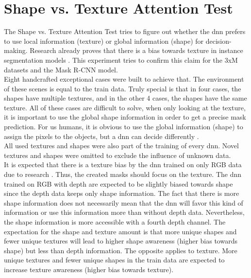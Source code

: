	\section{Shape vs. Texture Attention Test}
	\label{sec:shape-texutre-attention-test}
		The Shape vs. Texture Attention Test tries to figure out whether the \ac{dnn} prefers to use local information (texture) or global information (shape) for decision-making. Research already proves that there is a bias towards texture in instance segmentation models \cite{Theodoridis2022}. This experiment tries to confirm this claim for the 3xM datasets and the Mask R-CNN model.\\
		Eight handcrafted exceptional cases were built to achieve that. The environment of these scenes is equal to the train data. Truly special is that in four cases, the shapes have multiple textures, and in the other 4 cases, the shapes have the same texture. All of these cases are difficult to solve, when only looking at the texture, it is important to use the global shape information in order to get a precise mask prediction. For us humans, it is obvious to use the global information (shape) to assign the pixels to the objects, but a \ac{dnn} can decide differently \cite{Geirhos2020}\cite{Mohla2022}\cite{Baker2020}.\\
		All used textures and shapes were also part of the training of every \ac{dnn}. Novel textures and shapes were omitted to exclude the influence of unknown data.\\
		It is expected that there is a texture bias by the \ac{dnn} trained on only RGB data due to research \cite{Theodoridis2022}. Thus, the created masks should focus on the texture.
		The \ac{dnn} trained on RGB with depth are expected to be slightly biased towards shape since the depth data keeps only shape information. The fact that there is more shape information does not necessarily mean that the \ac{dnn} will favor this kind of information or use this information more than without depth data. Nevertheless, the shape information is more accessible with a fourth depth channel.%
		The expectation for the shape and texture amount is that more unique shapes and fewer unique textures will lead to higher shape awareness (higher bias towards shape) but less than depth information. The opposite applies to texture. More unique textures and fewer unique shapes in the train data are expected to increase texture awareness (higher bias towards texture). \\

